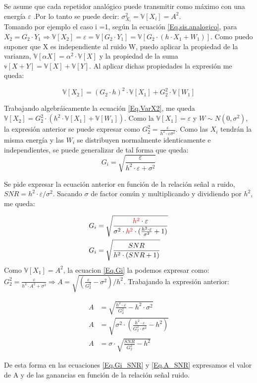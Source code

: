 \indent Se asume que cada repetidor analógico puede transmitir como máximo con una energía $\varepsilon$ .Por lo tanto se puede decir: $\sigma _{X_i}^{2} = \mathbb{V}[X_i] = A^2$. \\
\indent Tomando por ejemplo el caso i =1, según la ecuación \ref{Eq.sis.analogico}, para $X_2 = G_2 \cdot Y_1  \Rightarrow \mathbb{V}[X_2] = \varepsilon = \mathbb{V}[G_2 \cdot Y_1] = \mathbb{V}[G_2 \cdot (h \cdot X_1 + W_1)]$. Como puedo suponer que X es independiente al ruido W, puedo aplicar la propiedad de la varianza, $\mathbb{V}[\alpha X]= \alpha^2 \cdot \mathbb{V}[X]$ y la propiedad de la suma $\mathbb{v}[X+Y] = \mathbb{V}[X]+ \mathbb{V}[Y]$. Al aplicar dichas propiedades la expresión me queda:

				\begin{equation}
					\mathbb{V}[X_2] =(G_2 \cdot h)^2 \cdot \mathbb{V} [X_1] + G_2^2 \cdot \mathbb{V}[ W_1]
				\label{Eq.VarX2}
				\end{equation}  
	
\indent Trabajando algebráicamente la ecuación \ref{Eq.VarX2}, me queda $\mathbb{V}[X_2] = G_2^2 \cdot (h^2 \cdot \mathbb{V}[X_1] + \mathbb{V}[W_1])$. Como la $\mathbb{V}[X_1] = \varepsilon$ y $W \sim N(0,\sigma ^2)$, la expresión anterior se puede expresar como $G_2^2 = \frac{\varepsilon}{h^2 \cdot \varepsilon \sigma ^2}$. Como las $X_i$ tendrán la misma energía y las $W_i$ se distribuyen normalmente identicamente e independientes, se puede generalizar de tal forma que queda:
				\begin{equation}
					G_i = \sqrt{\frac{\varepsilon}{h^2 \cdot \varepsilon + \sigma ^2}}
				\label{Eq.Gi}
				\end{equation}

Se pide expresar la ecuación anterior en función de la relación señal a ruido, $SNR = h^2 \cdot \varepsilon / \sigma ^2$. Sacando $\sigma$ de factor común y multiplicando y dividiendo por $h^2$, me queda:
			
				\begin{align}
					G_i &= \sqrt{\frac{\textcolor{red}{h^2} \cdot \varepsilon}{\sigma ^2 \cdot \textcolor{red}{h^2} \cdot (\frac{h^2 \cdot \varepsilon}{\sigma ^2} + 1)}} \\
					G_i &= \sqrt{\frac{SNR}{h^2 \cdot (SNR + 1)}}
					\label{Eq.Gi_SNR}
				\end{align}
Como $\mathbb{V}[X_1] = A^2$, la ecuacion \ref{Eq.Gi} la podemos expresar como: $G_2 ^2 = \frac{\varepsilon}{h^2 \cdot A^2 + \sigma ^2} \Rightarrow A = \sqrt{(\frac{\varepsilon}{G_2^2}-\sigma ^2)/h^2}$. Trabajando la expresión anterior:

				\begin{align}
					A &= \sqrt{\frac{h^2 \cdot \varepsilon}{G_2^2}- h^2 \cdot \sigma ^2} \\	
					A &= \sqrt{\sigma ^2 \cdot (\frac{h^2 \cdot \varepsilon}{G_2^2 \cdot \sigma ^2}- h^2)} \\
					A &= \sigma \cdot \sqrt{\frac{SNR}{G_2^2}-h^2}
					\label{Eq.A_SNR}
				\end{align}
			
\indent De esta forma en las ecuaciones \ref{Eq.Gi_SNR} y \ref{Eq.A_SNR} expresamos el valor de A y de las ganancias en función de la relación señal ruido.
